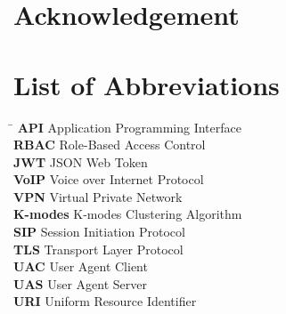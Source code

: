 \documentclass{article}
\begin{document}


\renewcommand{\listfigurename}{LIST OF FIGURES}
\renewcommand{\cftloftitlefont}{\Large\bfseries} 
\renewcommand{\cftafterloftitle}{
    \par\noindent\vspace{-0.5em}
    \textcolor{blue}{\rule{\textwidth}{0.5pt}}
    \vspace{1em} 
}
\renewcommand{\cftfigpresnum}{Figure~}
\renewcommand{\cftfigaftersnum}{:}
\setlength{\cftfignumwidth}{5em}


\renewcommand{\contentsname}{\centering TABLE OF CONTENTS}
\begin{center}
    \tableofcontents
\end{center}
\newpage

\section*{Acknowledgement}


\newpage
\vspace{2em}
\section*{List of Abbreviations}

\begin{tabbing}
    \hspace{4cm} \= \hspace{10cm} \kill
    \textbf{API} \> Application Programming Interface \\
    \textbf{RBAC} \> Role-Based Access Control \\
    \textbf{JWT} \> JSON Web Token \\
    \textbf{VoIP} \> Voice over Internet Protocol \\
    \textbf{VPN} \> Virtual Private Network \\
    \textbf{K-modes} \> K-modes Clustering Algorithm \\
    \textbf{SIP} \> Session Initiation Protocol \\
    \textbf{TLS} \> Transport Layer Protocol \\
    \textbf{UAC} \> User Agent Client \\
    \textbf{UAS} \> User Agent Server \\
    \textbf{URI} \> Uniform Resource Identifier \\
\end{tabbing}
\end{document}

